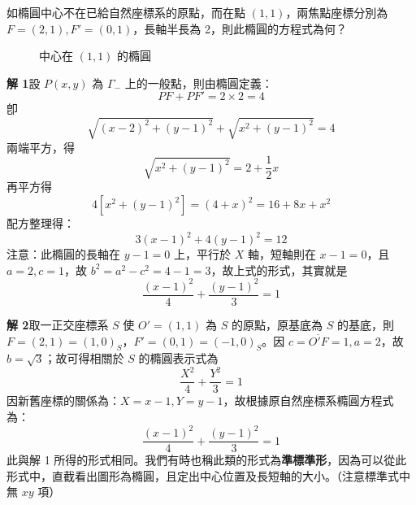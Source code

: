 \begin{example}
如橢圓中心不在已給自然座標系的原點，而在點 $(1,1)$，兩焦點座標分別為 $F=(2,1), F'=(0,1)$，長軸半長為 2，則此橢圓的方程式為何？

\begin{figure}[htbp]
\centering
{}
\caption{中心在 $(1,1)$ 的橢圓}
\label{fig:b4s-3-4}
\end{figure}

\textbf{解 1}\quad 設 $P(x,y)$ 為 $\Gamma_-$ 上的一般點，則由橢圓定義：
\[ PF + PF' = 2 \times 2 = 4 \]
卽
\[ \sqrt{(x-2)^2 + (y-1)^2} + \sqrt{x^2 + (y-1)^2} = 4 \]
兩端平方，得
\[ \sqrt{x^2 + (y-1)^2} = 2 + \frac{1}{2}x \]
再平方得
\[ 4[x^2 + (y-1)^2] = (4 + x)^2 = 16 + 8x + x^2 \]
配方整理得：
\[ 3(x-1)^2 + 4(y-1)^2 = 12 \]
注意：此橢圓的長軸在 $y-1=0$ 上，平行於 $X$ 軸，短軸則在 $x-1=0$，且 $a=2, c=1$，故 $b^2 = a^2 - c^2 = 4-1 = 3$，故上式的形式，其實就是
\[ \frac{(x-1)^2}{4} + \frac{(y-1)^2}{3} = 1 \]

\textbf{解 2}\quad 取一正交座標系 $S$ 使 $O'=(1,1)$ 為 $S$ 的原點，原基底為 $S$ 的基底，則 $F=(2,1) = (1,0)_S$，$F'=(0,1) = (-1,0)_S$。因 $c = \overline{O'F} = 1, a = 2$，故 $b = \sqrt{3}$；故可得相關於 $S$ 的橢圓表示式為
\[ \frac{X^2}{4} + \frac{Y^2}{3} = 1 \]
因新舊座標的關係為：$X = x-1, Y = y-1$，故根據原自然座標系橢圓方程式為：
\[ \frac{(x-1)^2}{4} + \frac{(y-1)^2}{3} = 1 \]
此與解 1 所得的形式相同。我們有時也稱此類的形式為\textbf{準標準形}，因為可以從此形式中，直截看出圖形為橢圓，且定出中心位置及長短軸的大小。（注意標準式中無 $xy$ 項）
\end{example}

